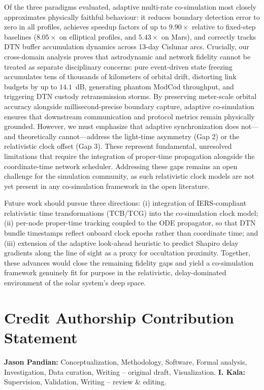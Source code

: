 \documentclass[a4paper,fleqn]{cas-sc}
\begin{document}
Of the three paradigms evaluated, adaptive multi-rate co-simulation most closely approximates physically faithful behaviour: it reduces boundary detection error to zero in all profiles, achieves speedup factors of up to $9.90\times$ relative to fixed-step baselines ($8.05\times$ on elliptical profiles, and $5.43\times$ on Mars), and correctly tracks DTN buffer accumulation dynamics across 13-day Cislunar arcs. Crucially, our cross-domain analysis proves that astrodynamic and network fidelity cannot be treated as separate disciplinary concerns: pure event-driven state freezing accumulates tens of thousands of kilometers of orbital drift, distorting link budgets by up to $14.1$~dB, generating phantom ModCod throughput, and triggering DTN custody retransmission storms. By preserving meter-scale orbital accuracy alongside millisecond-precise boundary capture, adaptive co-simulation ensures that downstream communication and protocol metrics remain physically grounded. However, we must emphasize that adaptive synchronization does not---and theoretically cannot---address the light-time asymmetry (Gap 2) or the relativistic clock offset (Gap 3). These represent fundamental, unresolved limitations that require the integration of proper-time propagation alongside the coordinate-time network scheduler. Addressing these gaps remains an open challenge for the simulation community, as such relativistic clock models are not yet present in any co-simulation framework in the open literature.

Future work should pursue three directions: (i) integration of IERS-compliant relativistic time transformations (TCB/TCG) into the co-simulation clock model; (ii) per-node proper-time tracking coupled to the ODE propagator, so that DTN bundle timestamps reflect onboard clock epochs rather than coordinate time; and (iii) extension of the adaptive look-ahead heuristic to predict Shapiro delay gradients along the line of sight as a proxy for occultation proximity. Together, these advances would close the remaining fidelity gaps and yield a co-simulation framework genuinely fit for purpose in the relativistic, delay-dominated environment of the solar system's deep space.

\section*{Credit Authorship Contribution Statement}
\textbf{Jason Pandian:} Conceptualization, Methodology, Software, Formal analysis, Investigation, Data curation, Writing -- original draft, Visualization. \textbf{I. Kala:} Supervision, Validation, Writing -- review \& editing.
\end{document}
